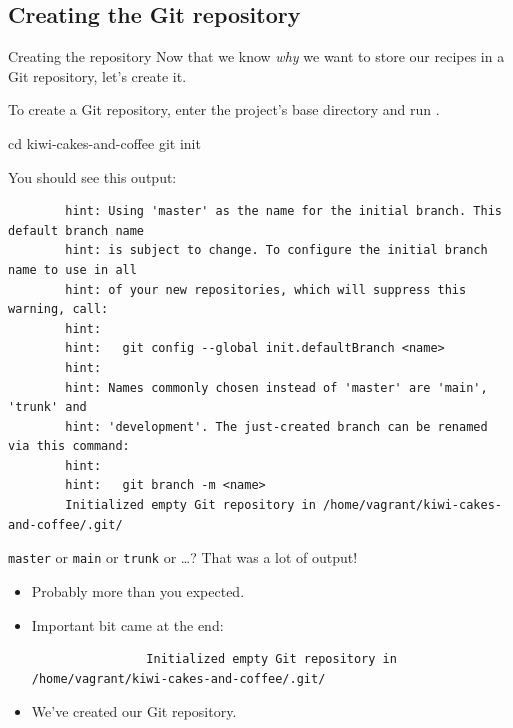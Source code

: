 \subsection{Creating the Git repository}

\begin{frame}[fragile]{Creating the repository}
    Now that we know \emph{why} we want to store our recipes in a Git
    repository, let's create it.

    To create a Git repository, enter the project's base directory and run
    .

    \begin{shellcode}
        cd kiwi-cakes-and-coffee
        git init
    \end{shellcode}

    You should see this output:
    \begin{verbatim}
        hint: Using 'master' as the name for the initial branch. This default branch name
        hint: is subject to change. To configure the initial branch name to use in all
        hint: of your new repositories, which will suppress this warning, call:
        hint:
        hint:   git config --global init.defaultBranch <name>
        hint:
        hint: Names commonly chosen instead of 'master' are 'main', 'trunk' and
        hint: 'development'. The just-created branch can be renamed via this command:
        hint:
        hint:   git branch -m <name>
        Initialized empty Git repository in /home/vagrant/kiwi-cakes-and-coffee/.git/
    \end{verbatim}
\end{frame}

\begin{frame}[fragile]{\texttt{master} or \texttt{main} or \texttt{trunk} or \ldots?}
    That was a lot of output!
    \begin{itemize}
        \item Probably more than you expected.
        \item Important bit came at the end:
            \begin{verbatim}
                Initialized empty Git repository in /home/vagrant/kiwi-cakes-and-coffee/.git/
            \end{verbatim}
        \item We've created our Git repository. 
    \end{itemize}
\end{frame}

